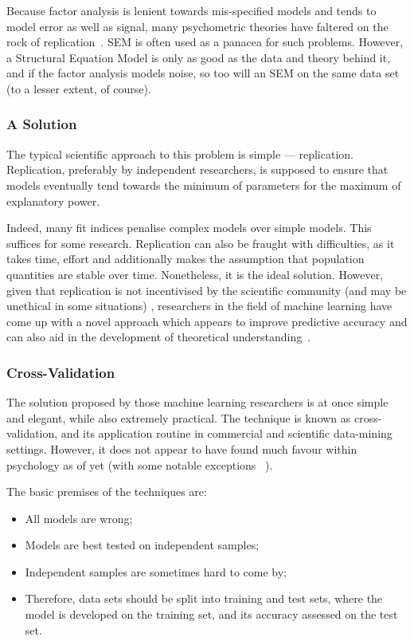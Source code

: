 Because factor analysis is lenient towards mis-specified models and tends to model error as well as signal, many psychometric theories have faltered on the rock of replication~\cite{fabrigar1999evaluating}. SEM is often used as a panacea for such problems. However, a Structural Equation Model is only as good as the data and theory behind it, and if the factor analysis models noise, so too will an SEM on the same data set (to a lesser extent, of course). %

\subsubsection{A Solution}

The typical scientific approach to this problem is simple --- replication. Replication, preferably by independent researchers, is supposed to ensure that models eventually tend towards the minimum of parameters for the maximum of explanatory power.

Indeed, many fit indices penalise complex models over simple models. This suffices for some research. Replication can also be fraught with difficulties, as it takes time, effort and additionally makes the assumption that population quantities are stable over time. Nonetheless, it is the ideal solution. However, given that replication is not incentivised by the scientific community (and may be unethical in some situations) \cite{roediger2013psychology}, researchers in the field of machine learning have come up with a novel approach which appears to improve predictive accuracy and can also aid in the development of theoretical understanding~\cite{friedman2009elements}.

\subsubsection{Cross-Validation}

The solution proposed by those machine learning researchers is at once simple and elegant, while also extremely practical. The technique is known as cross-validation, and its application routine in commercial and scientific data-mining settings. However, it does not appear to have found much favour within psychology as of yet (with some notable exceptions ~\cite{dawes1979robust}).

The basic premises of the techniques are:
\begin{itemize}
\item All models are wrong;
\item Models are best tested on independent samples;
\item Independent samples are sometimes hard to come by;
\item Therefore, data sets should be split into training and test sets, where the model is developed on the training set, and its accuracy assessed on the test set.
\end{itemize}

